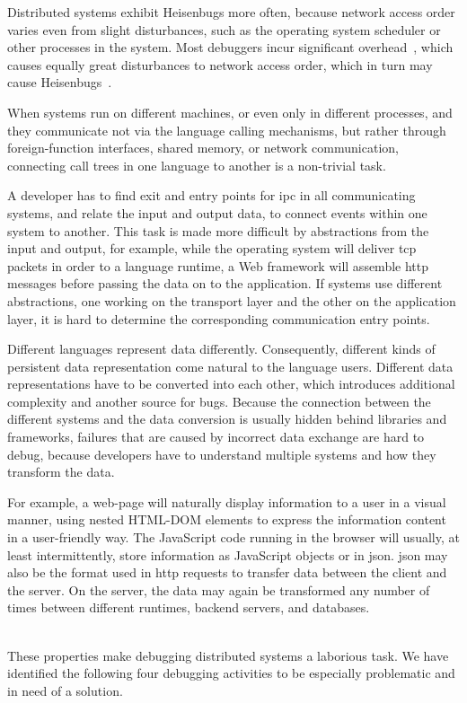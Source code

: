 \begin{description}
  Distributed systems exhibit Heisenbugs more often, because network
  access order varies even from slight disturbances, such as the
  operating system scheduler or other processes in the system. Most
  debuggers incur significant overhead~\cite{Corliss2005}, which
  causes equally great disturbances to network access order, which in
  turn may cause Heisenbugs~\cite{Gait1985}.
\item[Languages] When systems run on different machines, or even only
  in different processes, and they communicate not via the language
  calling mechanisms, but rather through foreign-function interfaces,
  shared memory, or network communication, connecting call trees in
  one language to another is a non-trivial task.

  A developer has to find exit and entry points for \ac{ipc} in all
  communicating systems, and relate the input and output data, to
  connect events within one system to another. This task is made more
  difficult by abstractions from the input and output, for example,
  while the operating system will deliver \ac{tcp} packets in order to
  a language runtime, a Web framework will assemble \ac{http} messages
  before passing the data on to the application. If systems use
  different abstractions, one working on the transport layer and the
  other on the application layer, it is hard to determine the
  corresponding communication entry points.
\item[Data Representation] Different languages represent data
  differently. Consequently, different kinds of persistent data
  representation come natural to the language users. Different data
  representations have to be converted into each other, which
  introduces additional complexity and another source for
  bugs. Because the connection between the different systems and the
  data conversion is usually hidden behind libraries and frameworks,
  failures that are caused by incorrect data exchange are hard to
  debug, because developers have to understand multiple systems and
  how they transform the data.

  For example, a web-page will naturally display information to a user
  in a visual manner, using nested \textsc{HTML}-\textsc{DOM} elements
  to express the information content in a user-friendly way. The
  JavaScript code running in the browser will usually, at least
  intermittently, store information as JavaScript objects or in
  \ac{json}. \ac{json} may also be the format used in \ac{http}
  requests to transfer data between the client and the server. On the
  server, the data may again be transformed any number of times
  between different runtimes, backend servers, and databases.
\end{description}
~\\
These properties make debugging distributed systems a laborious
task. We have identified the following four debugging activities to be
especially problematic and in need of a solution.

